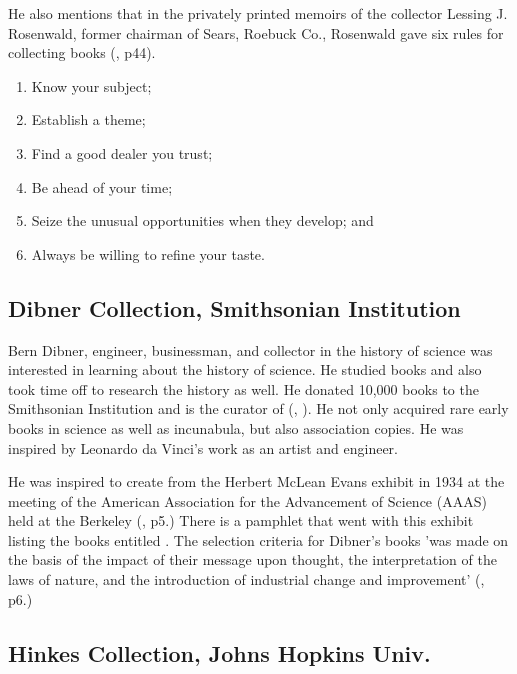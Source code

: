 \documentclass[letterpaper]{article}
\begin{document}
He also mentions that in the privately printed memoirs of the
collector Lessing J. Rosenwald, former chairman of Sears, Roebuck Co.,
Rosenwald gave six rules for collecting books (\cite{Basbanes1999},
p44).

\begin{enumerate}
\item Know your subject;
\item Establish a theme;
\item Find a good dealer you trust;
\item Be ahead of your time;
\item Seize the unusual opportunities when they develop; and
\item Always be willing to refine your taste.
\end{enumerate}

\subsection{Dibner Collection, Smithsonian Institution}

Bern Dibner, engineer, businessman, and collector in the history of
science was interested in learning about the history of science. He
studied books and also took time off to research the history as
well. He donated 10,000 books to the Smithsonian Institution and is
the curator of 
(\cite{Dibner1955}, \cite{Dibner1980}). He not only acquired rare early
books in science as well as incunabula, but also association copies.
He was inspired by Leonardo da Vinci's work as an artist and engineer.

He was inspired to create  from the Herbert
McLean Evans exhibit in 1934 at the  meeting of the American
Association for the Advancement of Science (AAAS) held at the Berkeley
(\cite{Dibner1980}, p5.)  There is a pamphlet that went with this
exhibit listing the books entitled . The selection
criteria for Dibner's books 'was made on the basis of the impact of
their message upon thought, the interpretation of the laws of nature,
and the introduction of industrial change and improvement'
(\cite{Dibner1980}, p6.)

\subsection{Hinkes Collection, Johns Hopkins Univ.}
\end{document}
